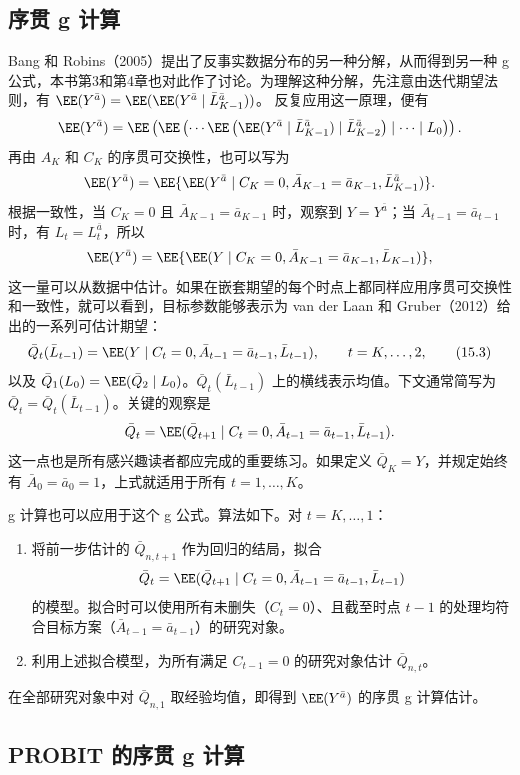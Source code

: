 \subsection{序贯 g 计算}

Bang 和 Robins（2005）提出了反事实数据分布的另一种分解，从而得到另一种 g 公式，本书第3和第4章也对此作了讨论。为理解这种分解，先注意由迭代期望法则，有
$\EE(Y^{\bar a})=\EE(\EE(Y^{\bar a}\mid\bar L_{K-1}^{\bar a}))$。
反复应用这一原理，便有
\[
 \EE(Y^{\bar a})=
 \EE\left(\EE\left(\cdots\EE\left(\EE(Y^{\bar a}\mid\bar L_{K-1}^{\bar a})
 \mid\bar L_{K-2}^{\bar a}\right)\mid\cdots\mid L_0\right)\right).
\]
再由 $A_K$ 和 $C_K$ 的序贯可交换性，也可以写为
\[
 \EE(Y^{\bar a})=\EE\{\EE(Y^{\bar a}\mid C_K=0,
 \bar A_{K-1}=\bar a_{K-1},\bar L_{K-1}^{\bar a})\}.
\]
根据一致性，当 $C_K=0$ 且 $\bar A_{K-1}=\bar a_{K-1}$ 时，观察到 $Y=Y^{\bar a}$；当 $\bar A_{t-1}=\bar a_{t-1}$ 时，有 $L_t=L_t^{\bar a}$，所以
\[
 \EE(Y^{\bar a})=\EE\{\EE(Y\mid C_K=0,
 \bar A_{K-1}=\bar a_{K-1},\bar L_{K-1})\},
\]
这一量可以从数据中估计。如果在嵌套期望的每个时点上都同样应用序贯可交换性和一致性，就可以看到，目标参数能够表示为 van der Laan 和 Gruber（2012）给出的一系列可估计期望：
\begin{equation}
 \bar Q_t(\bar L_{t-1})=\EE(Y\mid C_t=0,
 \bar A_{t-1}=\bar a_{t-1},\bar L_{t-1}),
 \qquad t=K,\ldots,2,
 \tag{15.3}
\end{equation}
以及 $\bar Q_1(L_0)=\EE(\bar Q_2\mid L_0)$。$\bar Q_t(\bar L_{t-1})$ 上的横线表示均值。下文通常简写为 $\bar Q_t=\bar Q_t(\bar L_{t-1})$。关键的观察是
\[
 \bar Q_t=\EE(\bar Q_{t+1}\mid C_t=0,
 \bar A_{t-1}=\bar a_{t-1},\bar L_{t-1}).
\]
这一点也是所有感兴趣读者都应完成的重要练习。如果定义 $\bar Q_K=Y$，并规定始终有 $\bar A_0=\bar a_0=1$，上式就适用于所有 $t=1,\ldots,K$。

g 计算也可以应用于这个 g 公式。算法如下。对 $t=K,\ldots,1$：
\begin{enumerate}
\item 将前一步估计的 $\bar Q_{n,t+1}$ 作为回归的结局，拟合
\[
 \bar Q_t=\EE(\bar Q_{t+1}\mid C_t=0,
 \bar A_{t-1}=\bar a_{t-1},\bar L_{t-1})
\]
的模型。拟合时可以使用所有未删失（$C_t=0$）、且截至时点 $t-1$ 的处理均符合目标方案（$\bar A_{t-1}=\bar a_{t-1}$）的研究对象。
\item 利用上述拟合模型，为所有满足 $C_{t-1}=0$ 的研究对象估计 $\bar Q_{n,t}$。
\end{enumerate}
在全部研究对象中对 $\bar Q_{n,1}$ 取经验均值，即得到 $\EE(Y^{\bar a})$ 的序贯 g 计算估计。

\subsection{PROBIT 的序贯 g 计算}

